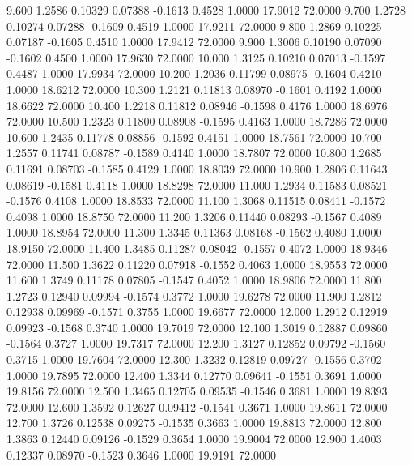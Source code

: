    9.600   1.2586   0.10329   0.07388  -0.1613   0.4528   1.0000  17.9012  72.0000
   9.700   1.2728   0.10274   0.07288  -0.1609   0.4519   1.0000  17.9211  72.0000
   9.800   1.2869   0.10225   0.07187  -0.1605   0.4510   1.0000  17.9412  72.0000
   9.900   1.3006   0.10190   0.07090  -0.1602   0.4500   1.0000  17.9630  72.0000
  10.000   1.3125   0.10210   0.07013  -0.1597   0.4487   1.0000  17.9934  72.0000
  10.200   1.2036   0.11799   0.08975  -0.1604   0.4210   1.0000  18.6212  72.0000
  10.300   1.2121   0.11813   0.08970  -0.1601   0.4192   1.0000  18.6622  72.0000
  10.400   1.2218   0.11812   0.08946  -0.1598   0.4176   1.0000  18.6976  72.0000
  10.500   1.2323   0.11800   0.08908  -0.1595   0.4163   1.0000  18.7286  72.0000
  10.600   1.2435   0.11778   0.08856  -0.1592   0.4151   1.0000  18.7561  72.0000
  10.700   1.2557   0.11741   0.08787  -0.1589   0.4140   1.0000  18.7807  72.0000
  10.800   1.2685   0.11691   0.08703  -0.1585   0.4129   1.0000  18.8039  72.0000
  10.900   1.2806   0.11643   0.08619  -0.1581   0.4118   1.0000  18.8298  72.0000
  11.000   1.2934   0.11583   0.08521  -0.1576   0.4108   1.0000  18.8533  72.0000
  11.100   1.3068   0.11515   0.08411  -0.1572   0.4098   1.0000  18.8750  72.0000
  11.200   1.3206   0.11440   0.08293  -0.1567   0.4089   1.0000  18.8954  72.0000
  11.300   1.3345   0.11363   0.08168  -0.1562   0.4080   1.0000  18.9150  72.0000
  11.400   1.3485   0.11287   0.08042  -0.1557   0.4072   1.0000  18.9346  72.0000
  11.500   1.3622   0.11220   0.07918  -0.1552   0.4063   1.0000  18.9553  72.0000
  11.600   1.3749   0.11178   0.07805  -0.1547   0.4052   1.0000  18.9806  72.0000
  11.800   1.2723   0.12940   0.09994  -0.1574   0.3772   1.0000  19.6278  72.0000
  11.900   1.2812   0.12938   0.09969  -0.1571   0.3755   1.0000  19.6677  72.0000
  12.000   1.2912   0.12919   0.09923  -0.1568   0.3740   1.0000  19.7019  72.0000
  12.100   1.3019   0.12887   0.09860  -0.1564   0.3727   1.0000  19.7317  72.0000
  12.200   1.3127   0.12852   0.09792  -0.1560   0.3715   1.0000  19.7604  72.0000
  12.300   1.3232   0.12819   0.09727  -0.1556   0.3702   1.0000  19.7895  72.0000
  12.400   1.3344   0.12770   0.09641  -0.1551   0.3691   1.0000  19.8156  72.0000
  12.500   1.3465   0.12705   0.09535  -0.1546   0.3681   1.0000  19.8393  72.0000
  12.600   1.3592   0.12627   0.09412  -0.1541   0.3671   1.0000  19.8611  72.0000
  12.700   1.3726   0.12538   0.09275  -0.1535   0.3663   1.0000  19.8813  72.0000
  12.800   1.3863   0.12440   0.09126  -0.1529   0.3654   1.0000  19.9004  72.0000
  12.900   1.4003   0.12337   0.08970  -0.1523   0.3646   1.0000  19.9191  72.0000

